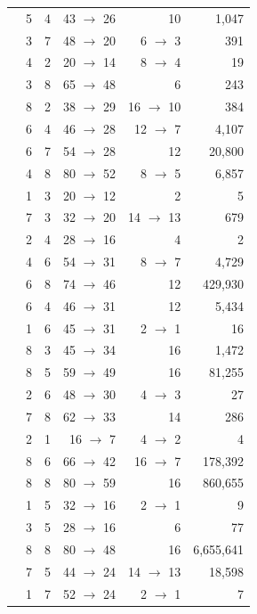 \begin{longtable}{@{}L{4.4cm} r r r r r@{}}
 & 5 & 4 & 43 $\to$ 26 & 10 & 1,047 \\
 & 3 & 7 & 48 $\to$ 20 & 6 $\to$ 3 & 391 \\
 & 4 & 2 & 20 $\to$ 14 & 8 $\to$ 4 & 19 \\
 & 3 & 8 & 65 $\to$ 48 & 6 & 243 \\
 & 8 & 2 & 38 $\to$ 29 & 16 $\to$ 10 & 384 \\
 & 6 & 4 & 46 $\to$ 28 & 12 $\to$ 7 & 4,107 \\
 & 6 & 7 & 54 $\to$ 28 & 12 & 20,800 \\
 & 4 & 8 & 80 $\to$ 52 & 8 $\to$ 5 & 6,857 \\
 & 1 & 3 & 20 $\to$ 12 & 2 & 5 \\
 & 7 & 3 & 32 $\to$ 20 & 14 $\to$ 13 & 679 \\
 & 2 & 4 & 28 $\to$ 16 & 4 & 2 \\
 & 4 & 6 & 54 $\to$ 31 & 8 $\to$ 7 & 4,729 \\
 & 6 & 8 & 74 $\to$ 46 & 12 & 429,930 \\
 & 6 & 4 & 46 $\to$ 31 & 12 & 5,434 \\
 & 1 & 6 & 45 $\to$ 31 & 2 $\to$ 1 & 16 \\
 & 8 & 3 & 45 $\to$ 34 & 16 & 1,472 \\
 & 8 & 5 & 59 $\to$ 49 & 16 & 81,255 \\
 & 2 & 6 & 48 $\to$ 30 & 4 $\to$ 3 & 27 \\
 & 7 & 8 & 62 $\to$ 33 & 14 & 286 \\
 & 2 & 1 & 16 $\to$ 7 & 4 $\to$ 2 & 4 \\
 & 8 & 6 & 66 $\to$ 42 & 16 $\to$ 7 & 178,392 \\
 & 8 & 8 & 80 $\to$ 59 & 16 & 860,655 \\
 & 1 & 5 & 32 $\to$ 16 & 2 $\to$ 1 & 9 \\
 & 3 & 5 & 28 $\to$ 16 & 6 & 77 \\
 & 8 & 8 & 80 $\to$ 48 & 16 & 6,655,641 \\
 & 7 & 5 & 44 $\to$ 24 & 14 $\to$ 13 & 18,598 \\
 & 1 & 7 & 52 $\to$ 24 & 2 $\to$ 1 & 7 \\

\end{longtable}
